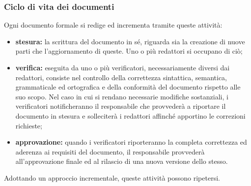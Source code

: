     \subsubsection{Ciclo di vita dei documenti}
    \label{ciclovitadoc}
        Ogni documento formale si redige ed incrementa tramite queste attività:
        \begin{itemize}
            \item \textbf{stesura: }la scrittura del documento in sé, riguarda sia la creazione di nuove parti che l'aggiornamento di queste. Uno o più redattori si occupano di ciò;
            \item \textbf{verifica: }eseguita da uno o più verificatori, necessariamente diversi dai redattori, consiste nel controllo della correttezza sintattica, semantica, grammaticale ed ortografica e della conformità del documento rispetto alle suo scopo. Nel caso in cui si rendano necessarie modifiche sostanziali, i verificatori notificheranno il responsabile che provvederà a riportare il documento in stesura e solleciterà i redattori affinché apportino le correzioni richieste;
            \item \textbf{approvazione: }quando i verificatori riporteranno la completa correttezza ed aderenza ai requisiti del documento, il responsabile provvederà all'approvazione finale ed al rilascio di una nuova versione dello stesso.
        \end{itemize}
        Adottando un approccio incrementale, queste attività possono ripetersi.
